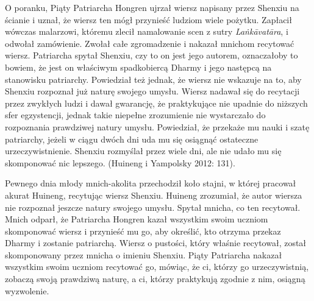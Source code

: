 O poranku, Piąty Patriarcha Hongren ujrzał wiersz napisany przez Shenxiu na ścianie i uznał, że wiersz ten mógł przynieść ludziom wiele pożytku. Zapłacił wówczas malarzowi, któremu zlecił namalowanie scen z sutry \textit{La\.nkāvatāra}, i odwołał zamówienie. Zwołał całe zgromadzenie i nakazał mnichom recytować wiersz. Patriarcha spytał Shenxiu, czy to on jest jego autorem, oznaczałoby to bowiem, że jest on właściwym spadkobiercą Dharmy i jego następcą na stanowisku patriarchy. Powiedział też jednak, że wiersz nie wskazuje na to, aby Shenxiu rozpoznał już naturę swojego umysłu. Wiersz nadawał się do recytacji przez zwykłych ludzi i dawał gwarancję, że praktykujące nie upadnie do niższych sfer egzystencji\fnm, jednak takie niepełne zrozumienie nie wystarczało do rozpoznania prawdziwej natury umysłu. Powiedział, że przekaże mu nauki i szatę patriarchy, jeżeli w ciągu dwóch dni uda mu się osiągnąć ostateczne urzeczywistnienie. Shenxiu rozmyślał przez wiele dni, ale nie udało mu się skomponować nic lepszego. (Huineng i Yampolsky 2012: 131).
%

Pewnego dnia młody mnich-akolita przechodził koło stajni, w której pracował akurat Huineng, recytując wiersz Shenxiu. Huineng zrozumiał, że autor wiersza nie rozpoznał jeszcze natury swojego umysłu. Spytał mnicha, co ten recytował. Mnich odparł, że Patriarcha Hongren kazał wszystkim swoim uczniom skomponować wiersz i przynieść mu go, aby określić, kto otrzyma przekaz Dharmy i zostanie patriarchą. Wiersz o pustości, który właśnie recytował, został skomponowany przez mnicha o imieniu Shenxiu. Piąty Patriarcha nakazał wszystkim swoim uczniom recytować go, mówiąc, że ci, którzy go urzeczywistnią, zobaczą swoją prawdziwą naturę, a ci, którzy praktykują zgodnie z nim, osiągną wyzwolenie.

